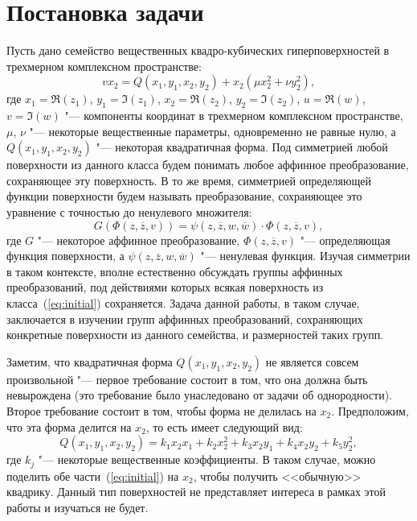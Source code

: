 \documentclass[a4paper,14pt]{extarticle}
\begin{document}
\section{Постановка задачи}
Пусть дано семейство вещественных квадро-кубических гиперповерхностей в трехмерном комплексном пространстве:
\begin{equation}\label{eq:initial}
v x_2 = Q(x_1, y_1, x_2, y_2) + x_2 (\mu x_2^2 + \nu y_2^2),
\end{equation}
где $x_1 = \Re(z_1)$, $y_1 = \Im(z_1)$, $x_2 = \Re(z_2)$, $y_2 = \Im(z_2)$, $u = \Re(w)$, $v= \Im(w)$ "--- компоненты координат в трехмерном комплексном пространстве, $\mu$, $\nu$ "--- некоторые вещественные параметры, одновременно не равные нулю, а $Q(x_1, y_1, x_2, y_2)$ "--- некоторая квадратичная форма. Под симметрией любой поверхности из данного класса будем понимать любое аффинное преобразование, сохраняющее эту поверхность. В то же время, симметрией определяющей функции поверхности будем называть преобразование, сохраняющее это уравнение с точностью до ненулевого множителя:
\begin{equation}\label{eq:preservation}
G(\Phi(z, \overline{z}, v)) = \psi(z, \overline{z}, w, \overline{w}) \cdot \Phi(z, \overline{z}, v),
\end{equation}
где $G$ "--- некоторое аффинное преобразование, $\Phi(z, \overline z, v)$ "--- определяющая функция поверхности, а $\psi(z, \overline z, w, \overline w)$ "--- ненулевая функция. Изучая симметрии в таком контексте, вполне естественно обсуждать группы аффинных преобразований, под действиями которых всякая поверхность из класса~(\ref{eq:initial}) сохраняется. Задача данной работы, в таком случае, заключается в изучении групп аффинных преобразований, сохраняющих конкретные поверхности из данного семейства, и размерностей таких групп. 

Заметим, что квадратичная форма $Q(x_1, y_1, x_2, y_2)$ не является совсем произвольной "--- первое требование состоит в том, что она должна быть невырождена  (это требование было унаследовано от задачи об однородности). Второе требование состоит в том, чтобы форма не делилась на $x_2$. Предположим, что эта форма делится на $x_2$, то есть имеет следующий вид:
\begin{equation*}
Q(x_1, y_1, x_2, y_2) = k_1 x_2 x_1 + k_2 x_2^2 + k_3 x_2 y_1 + k_4 x_2 y_2 + k_{5} y_2^2,
\end{equation*}
где $k_j$ "--- некоторые вещественные коэффициенты. В таком случае, можно поделить обе части~(\ref{eq:initial}) на $x_2$, чтобы получить <<обычную>> квадрику. Данный тип поверхностей не представляет интереса в рамках этой работы и изучаться не будет. 
\end{document}
